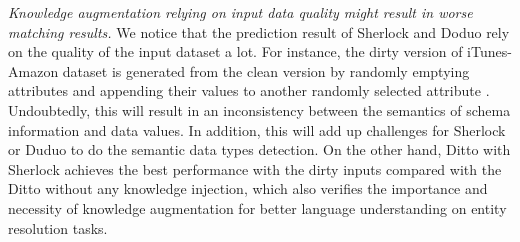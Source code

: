 \textit{Knowledge augmentation relying on input data quality might result in worse matching results.}
We notice that the prediction result of Sherlock and Doduo rely on the quality of the input dataset a lot. For instance, the dirty version of iTunes-Amazon dataset is generated from the clean version by randomly emptying attributes and appending their values to another randomly selected
attribute \cite{li_deep_2020}. Undoubtedly, this will result in an inconsistency between the semantics of schema information and data values. In addition, this will add up challenges for Sherlock or Duduo to do the semantic data types detection. On the other hand, Ditto with Sherlock achieves the best performance with the dirty inputs compared with the Ditto without any knowledge injection, which also verifies the importance and necessity of knowledge augmentation for better language understanding on entity resolution tasks.


